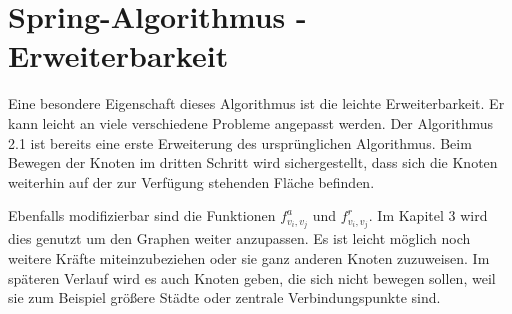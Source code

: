 \section{Spring-Algorithmus - Erweiterbarkeit}
\label{Kapitel_3_-_Unterkapitel_3}   
Eine besondere Eigenschaft dieses Algorithmus ist die leichte Erweiterbarkeit. Er kann leicht an viele verschiedene Probleme angepasst werden.
Der Algorithmus 2.1 ist bereits eine erste Erweiterung des ursprünglichen Algorithmus. Beim Bewegen der Knoten im dritten Schritt wird sichergestellt, dass sich die Knoten weiterhin auf der zur Verfügung stehenden Fläche befinden.

Ebenfalls modifizierbar sind die Funktionen $f^{a}_{v_{i},v_{j}}$ und $f^{r}_{v_{i},v_{j}}$. Im Kapitel 3 wird dies genutzt um den Graphen weiter anzupassen. Es ist leicht möglich noch weitere Kräfte miteinzubeziehen oder sie ganz anderen Knoten zuzuweisen. Im späteren Verlauf wird es auch Knoten geben, die sich nicht bewegen sollen, weil sie zum Beispiel größere Städte oder zentrale Verbindungspunkte sind.

%